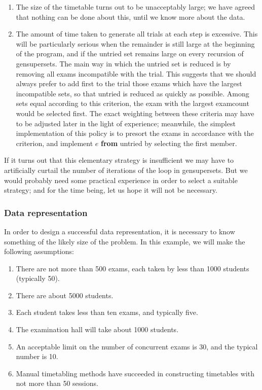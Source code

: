 \begin{enumerate}[leftmargin=2\parindent, label=(\arabic*)]
	\item The size of the timetable turns out to be unacceptably large; we have agreed that nothing can be done about this, until we know more about the data.

	\item The amount of time taken to generate all trials at each step is excessive. This will be particularly serious when the remainder is still large at the beginning of the program, and if the untried set remains large on every recursion of gensupersets. The main way in which the untried set is reduced is by removing all exams incompatible with the trial. This suggests that we should always prefer to add first to the trial those exams which have the largest incompatible sets, so that untried is reduced as quickly as possible. Among sets equal according to this criterion, the exam with the largest examcount would be selected first. The exact weighting between these criteria may have to be adjusted later in the light of experience; meanwhile, the simplest implementation of this policy is to presort the exams in accordance with the criterion, and implement $e$ \textbf{from} untried by selecting the first member.
\end{enumerate}

If it turns out that this elementary strategy is insufficient we may have to artificially curtail the number of iterations of the loop in gensupersets. But we would probably need some practical experience in order to select a suitable strategy; and for the time being, let us hope it will not be necessary.

\subsubsection{Data representation}

In order to design a successful data representation, it is necessary to know
something of the likely size of the problem. In this example, we will make the
following assumptions:

\begin{enumerate}[leftmargin=2\parindent, label=(\arabic*)]
	\item There are not more than 500 exams, each taken by less than 1000 students (typically 50).
	\item There are about 5000 students.
	\item Each student takes less than ten exams, and typically five.
	\item The examination hall will take about 1000 students.
	\item An acceptable limit on the number of concurrent exams is 30, and the typical number is 10.
	\item Manual timetabling methods have succeeded in constructing timetables with not more than 50 sessions.
\end{enumerate}


